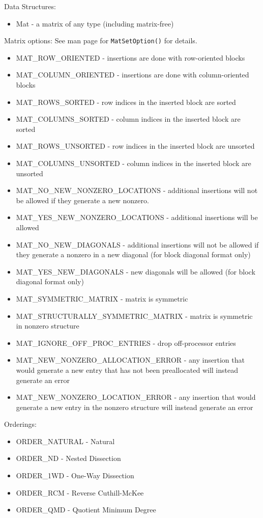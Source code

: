 \noindent
Data Structures: 
\begin{itemize}
\item Mat - a matrix of any type (including matrix-free)
\end{itemize}
Matrix options:  See man page for {\tt MatSetOption()} for details. 
\begin{itemize}
\item MAT\_ROW\_ORIENTED - insertions are done with row-oriented blocks
\item MAT\_COLUMN\_ORIENTED - insertions are done with column-oriented blocks
\item MAT\_ROWS\_SORTED - row indices in the inserted block are sorted
\item MAT\_COLUMNS\_SORTED - column indices in the inserted block are sorted
\item MAT\_ROWS\_UNSORTED - row indices in the inserted block are unsorted
\item MAT\_COLUMNS\_UNSORTED - column indices in the inserted block are unsorted
\item MAT\_NO\_NEW\_NONZERO\_LOCATIONS - additional insertions will not be allowed if they
      generate a new nonzero.
\item MAT\_YES\_NEW\_NONZERO\_LOCATIONS - additional insertions will be allowed
\item MAT\_NO\_NEW\_DIAGONALS - additional insertions will not be allowed if
         they generate a nonzero in a new diagonal (for block diagonal format only)
\item MAT\_YES\_NEW\_DIAGONALS - new diagonals will be allowed (for block diagonal format only)
\item MAT\_SYMMETRIC\_MATRIX - matrix is symmetric
\item MAT\_STRUCTURALLY\_SYMMETRIC\_MATRIX - matrix is symmetric in nonzero structure
\item MAT\_IGNORE\_OFF\_PROC\_ENTRIES - drop off-processor entries
\item MAT\_NEW\_NONZERO\_ALLOCATION\_ERROR - any insertion 
   that would generate a new entry that has not been preallocated will instead
   generate an error
\item MAT\_NEW\_NONZERO\_LOCATION\_ERROR - any insertion 
   that would generate a new entry in the nonzero structure will instead generate
   an error
\end{itemize}
Orderings:
\begin{itemize}
\item ORDER\_NATURAL - Natural
\item ORDER\_ND - Nested Dissection
\item ORDER\_1WD - One-Way Dissection 
\item ORDER\_RCM - Reverse Cuthill-McKee
\item ORDER\_QMD - Quotient Minimum Degree
\end{itemize}
